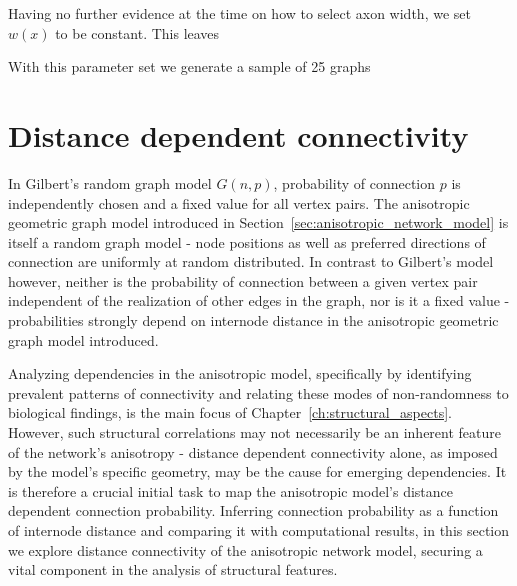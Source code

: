 Having no further evidence at the time on how to select axon width, we
set $w(x)$ to be constant. This leaves 



With this parameter set we generate a sample of 25 graphs %

\clearpage
\newpage




\section{Distance dependent connectivity}
\label{sec:distance_connectivity}



In Gilbert's random graph model $G(n,p)$,
probability of connection $p$ is independently chosen and a fixed
value for all vertex pairs. The anisotropic geometric graph model
introduced in Section~\ref{sec:anisotropic_network_model} is itself a
random graph model - node positions as well as preferred directions of
connection are uniformly at random distributed. In contrast to
Gilbert's model however, neither is the probability of connection
between a given vertex pair independent of the realization of other
edges in the graph, nor is it a fixed value - probabilities strongly
depend on internode distance in the anisotropic geometric graph model
introduced.

Analyzing dependencies in the anisotropic model, specifically by
identifying prevalent patterns of connectivity and relating these
modes of non-randomness to biological findings, is the main focus of
Chapter~\ref{ch:structural_aspects}. However, such structural
correlations may not necessarily be an inherent feature of the
network's anisotropy - distance dependent connectivity alone, as
imposed by the model's specific geometry, may be the cause for
emerging dependencies. It is therefore a crucial initial task to map
the anisotropic model's distance dependent connection
probability. Inferring connection probability as a function of
internode distance and comparing it with computational results, in
this section we explore distance connectivity of the anisotropic
network model, securing a vital component in the analysis of
structural features.


